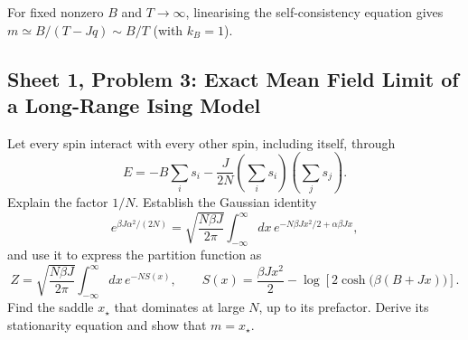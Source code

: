 \begin{solution}
    For fixed nonzero $B$ and $T\to\infty$, linearising the self-consistency equation gives $m\simeq B/(T-Jq)\sim B/T$ (with $k_B=1$).


\end{solution}

\subsection{Sheet 1, Problem 3: Exact Mean Field Limit of a Long-Range Ising Model}

Let every spin interact with every other spin, including itself, through
\begin{equation}
    E=-B\sum_i s_i-\frac{J}{2N}
    \left(\sum_i s_i\right)\left(\sum_j s_j\right).
\end{equation}
Explain the factor $1/N$. Establish the Gaussian identity
\begin{equation}
    e^{\beta J\alpha^2/(2N)}
    =\sqrt{\frac{N\beta J}{2\pi}}
    \int_{-\infty}^{\infty}dx\,
    e^{-N\beta Jx^2/2+\alpha\beta Jx},
\end{equation}
and use it to express the partition function as
\begin{equation}
    Z=\sqrt{\frac{N\beta J}{2\pi}}
    \int_{-\infty}^{\infty}dx\,e^{-NS(x)},
    \qquad
    S(x)=\frac{\beta Jx^2}{2}
    -\log\!\left[2\cosh\bigl(\beta(B+Jx)\bigr)\right].
\end{equation}
Find the saddle $x_\star$ that dominates at large $N$, up to its prefactor.
Derive its stationarity equation and show that $m=x_\star$.

